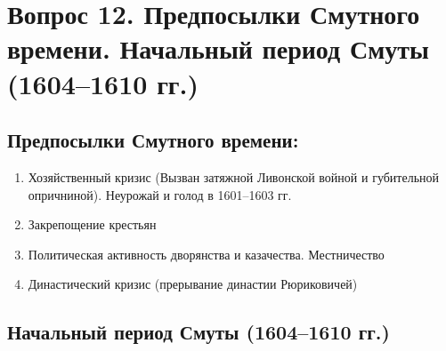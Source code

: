\section{Вопрос 12. Предпосылки Смутного времени. Начальный период Смуты (1604--1610 гг.)}

\subsection{Предпосылки Смутного времени:}

\begin{enumerate}
    \item{ Хозяйственный кризис (Вызван затяжной Ливонской войной и губительной опричниной). Неурожай и голод в 1601--1603 гг. }
    \item{ Закрепощение крестьян }
    \item{ Политическая активность дворянства и казачества. Местничество }
    \item{ Династический кризис (прерывание династии Рюриковичей) }
\end{enumerate}

\subsection{Начальный период Смуты (1604--1610 гг.)}

